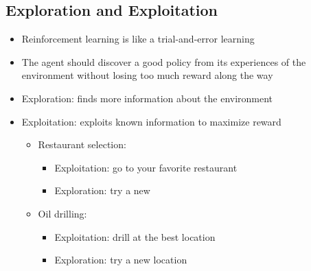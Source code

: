 \subsection{Exploration and Exploitation}
\begin{itemize}
	\item Reinforcement learning is like a trial-and-error learning
	\item The agent should discover a good policy from its experiences of the environment without losing too much reward along the way
	\item Exploration: finds more information about the environment
	\item Exploitation: exploits known information to maximize reward
	\begin{itemize}
		\item Restaurant selection: 
			\begin{itemize}
				\item Exploitation: go to your favorite restaurant 
				\item Exploration: try a new
			\end{itemize}
		\item Oil drilling: 
			\begin{itemize}
				\item Exploitation: drill at the best location 
				\item Exploration: try a new location
			\end{itemize}
			
	\end{itemize}
\end{itemize}




